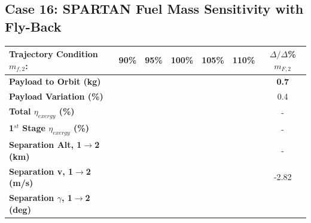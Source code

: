 \subsection{Case 16: SPARTAN Fuel Mass Sensitivity with Fly-Back}

\begin{table}[ht]
	\centering
\begin{tabular}{l c c c c c c} 
	\hline \textbf{Trajectory Condition}   \qquad  $m_{f,2}$:
	&90\%
	&95\%
	&100\%
	&105\%
	&110\%
	& $\Delta/\Delta$\%$m_{F,2}$
	\\
	\hline \textbf{Payload to Orbit (kg)}
	& \textbf{\PayloadToOrbitmFuelNinety}
	& \textbf{\PayloadToOrbitmFuelNinetyFive}
	& \textbf{\PayloadToOrbitmFuelStandard}
	& \textbf{\PayloadToOrbitmFuelOneHundredFive}
	& \textbf{\PayloadToOrbitmFuelOneHundredTen}
	&\textbf{0.7}
	\\
	\textbf{Payload Variation (\%)}
	& \PayloadVarmFuelNinety
	& \PayloadVarmFuelNinetyFive
	& \PayloadVarmFuelStandard
	& \PayloadVarmFuelOneHundredFive
	& \PayloadVarmFuelOneHundredTen
	&0.4
	\\
	\textbf{Total $\eta_{exergy}$ (\%)}
	& \textbf{\totalExergyEffmFuelNinety}
	& \textbf{\totalExergyEffmFuelNinetyFive}
	& \textbf{\totalExergyEffmFuelStandard}
	& \textbf{\totalExergyEffmFuelOneHundredFive}
	& \textbf{\totalExergyEffmFuelOneHundredTen}
	& -
	\\
	\hline 
	\textbf{1$^{st}$ Stage $\eta_{exergy}$ (\%)}
	& \textbf{\firstExergyEffmFuelNinety}
	& \textbf{\firstExergyEffmFuelNinetyFive}
	& \textbf{\firstExergyEffmFuelStandard}
	& \textbf{\firstExergyEffmFuelOneHundredFive}
	& \textbf{\firstExergyEffmFuelOneHundredTen}
	& -
	\\
	\textbf{Separation Alt, 1$\rightarrow$2 (km)}
	& \firstsecondSeparationAltmFuelNinety
	& \firstsecondSeparationAltmFuelNinetyFive
	& \firstsecondSeparationAltmFuelStandard
	& \firstsecondSeparationAltmFuelOneHundredFive
	& \firstsecondSeparationAltmFuelOneHundredTen
	& -
	\\
	\textbf{Separation v, 1$\rightarrow$2 (m/s)}
	& \firstsecondSeparationvmFuelNinety
	& \firstsecondSeparationvmFuelNinetyFive
	& \firstsecondSeparationvmFuelStandard
	& \firstsecondSeparationvmFuelOneHundredFive
	& \firstsecondSeparationvmFuelOneHundredTen
	&-2.82
	\\
	\textbf{Separation $\gamma$, 1$\rightarrow$2 (deg)}
	& \firstsecondSeparationgammamFuelNinety
	& \firstsecondSeparationgammamFuelNinetyFive
	& \firstsecondSeparationgammamFuelStandard
	& \firstsecondSeparationgammamFuelOneHundredFive

\end{tabular}
\end{table}
